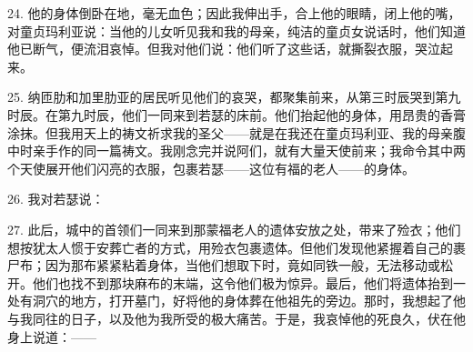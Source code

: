 24. 他的身体倒卧在地，毫无血色；因此我伸出手，合上他的眼睛，闭上他的嘴，对童贞玛利亚说：当他的儿女听见我和我的母亲，纯洁的童贞女说话时，他们知道他已断气，便流泪哀悼。但我对他们说：他们听了这些话，就撕裂衣服，哭泣起来。\par

25. 纳匝肋和加里肋亚的居民听见他们的哀哭，都聚集前来，从第三时辰哭到第九时辰。在第九时辰，他们一同来到若瑟的床前。他们抬起他的身体，用昂贵的香膏涂抹。但我用天上的祷文祈求我的圣父——就是在我还在童贞玛利亚、我的母亲腹中时亲手作的同一篇祷文。我刚念完并说阿们，就有大量天使前来；我命令其中两个天使展开他们闪亮的衣服，包裹若瑟——这位有福的老人——的身体。\par

26. 我对若瑟说：\par

27. 此后，城中的首领们一同来到那蒙福老人的遗体安放之处，带来了殓衣；他们想按犹太人惯于安葬亡者的方式，用殓衣包裹遗体。但他们发现他紧握着自己的裹尸布；因为那布紧紧粘着身体，当他们想取下时，竟如同铁一般，无法移动或松开。他们也找不到那块麻布的末端，这令他们极为惊异。最后，他们将遗体抬到一处有洞穴的地方，打开墓门，好将他的身体葬在他祖先的旁边。那时，我想起了他与我同往的日子，以及他为我所受的极大痛苦。于是，我哀悼他的死良久，伏在他身上说道：——\par

